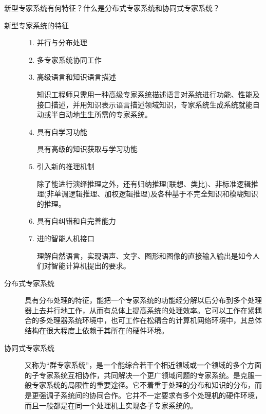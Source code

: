 \begin{question}
新型专家系统有何特征？什么是分布式专家系统和协同式专家系统？ 
\end{question}
\begin{solution}
	\begin{description}
		\item[新型专家系统的特征] \quad
			\begin{enumerate}
				\item 并行与分布处理
				\item 多专家系统协同工作
				\item 高级语言和知识语言描述 \par
				知识工程师只需用一种高级专家系统描述语言对系统进行功能、性能及接口描述，并用知识表示语言描述领域知识，专家系统生成系统就能自动或半自动地生生所需的专家系统。
				\item 具有自学习功能 \par
				具有高级的知识获取与学习功能 
				\item 引入新的推理机制 \par
				除了能进行演绎推理之外，还有归纳推理(联想、类比)、非标准逻辑推理(非单调逻辑推理、加权逻辑推理)及各种基于不完全知识和模糊知识的推理。
				\item 具有自纠错和自完善能力 
				\item 进的智能人机接口 \par
				理解自然语言，实现语声、文字、图形和图像的直接输入输出是如今人们对智能计算机提出的要求。 
			\end{enumerate}
		\item[分布式专家系统]
		具有分布处理的特征，能把一个专家系统的功能经分解以后分布到多个处理器上去并行地工作，从而有总体上提高系统的处理效率。它可以工作在紧耦合的多处理器系统环境中，也可工作在松耦合的计算机网络环境中，其总体结构在很大程度上依赖于其所在的硬件环境。 
		\item[协同式专家系统]
		又称为“群专家系统”，是一个能综合若干个相近领域或一个领域的多个方面的子专家系统互相协作，共同解决一个更广领域问题的专家系统。是克服一般专家系统的局限性的重要途径。它不着重于处理的分布和知识的分布，而是更强调子系统间的协同合作。它并不一定要求有多个处理机的硬件环境，而且一般都是在同一个处理机上实现各子专家系统的。
	\end{description}
\end{solution}

